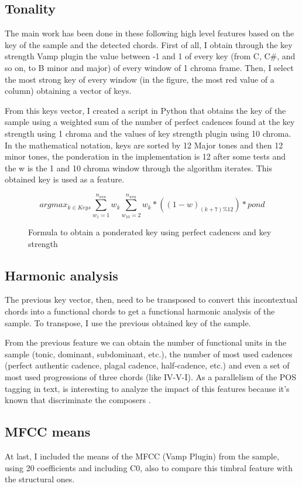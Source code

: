 \documentclass{article}
\begin{document}
\subsection{Tonality}\label{subsec:chord_windows}
The main work has been done in these following high level features based on the key of the sample and the detected chords. First of all, I obtain through the key strength Vamp plugin the value between -1 and 1 of every key (from C, C\#, and so on, to B minor and major) of every window of 1 chroma frame. Then, I select the most strong key of every window (in the figure, the most red value of a column) obtaining a vector of keys.

From this keys vector, I created a script in Python that obtains the key of the sample using a weighted sum of the number of perfect cadences found at the key strength using 1 chroma and the values of key strength plugin using 10 chroma. In the mathematical notation, keys are sorted by 12 Major tones and then 12 minor tones, the ponderation in the implementation is 12 after some tests and the w is the 1 and 10 chroma window through the algorithm iterates. This obtained key is used as a feature.

\begin{figure}
\[ argmax_{k \in Keys} \sum_{w_{1}=1}^{n_{win}} w_k \sum_{w_{10}=2}^{n_{win}} w_k * ((1-w)_{(k+7)\%12})*pond \]
\caption{Formula to obtain a ponderated key using perfect cadences and key strength} \label{fig:keyFormula}
\end{figure}


\subsection{Harmonic analysis}\label{subsec:uni_bi_tri}
The previous key vector, then, need to be transposed to convert this incontextual chords into a functional chords to get a functional harmonic analysis of the sample. To transpose, I use the previous obtained key of the sample.

From the previous feature we can obtain the number of functional units in the sample (tonic, dominant, subdominant, etc.), the number of most used cadences (perfect authentic cadence, plagal cadence, half-cadence, etc.) and even a set of most used progressions of three chords (like IV-V-I). As a parallelism of the POS tagging in text, is interesting to analyze the impact of this features because it's known that discriminate the composers \cite{desportes}.

\subsection{MFCC means}\label{subsec:mfcc_means}
At last, I included the means of the MFCC (Vamp Plugin) from the sample, using 20 coefficients and including C0, also to compare this timbral feature with the structural ones.
\end{document}
